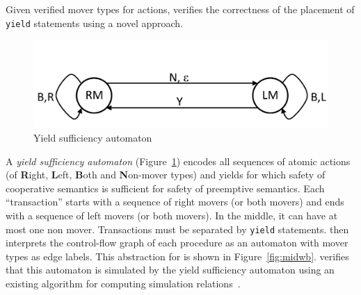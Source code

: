 Given verified mover types for actions, \civl verifies the correctness of the placement of {\tt yield} statements using a novel approach.
\begin{figure}
\vspace*{-1cm}
\begin{center}
\includegraphics[scale=0.25]{YieldTypeCheckingAutomaton.pdf}
\end{center} 
\vspace*{-0.3cm}
\caption{Yield sufficiency automaton}
\label{fig:ysa}
\end{figure}
A {\em yield sufficiency automaton\/} (Figure~\ref{fig:ysa})
encodes all sequences of atomic actions (of {\bf R}ight, 
{\bf L}eft,
{\bf B}oth and
{\bf N}on-mover types)  and yields for which safety of cooperative semantics is sufficient 
for safety of preemptive semantics. 
Each ``transaction'' starts with a sequence of right movers (or both movers) and ends with a sequence of left movers (or both movers).
In the middle, it can have at most one non mover. Transactions must be
separated by {\tt yield} statements.
\civl then interprets the control-flow graph of each procedure as an automaton with mover types as edge labels. 
This abstraction for  is shown in Figure~\ref{fig:midwb}.
\civl verifies that this automaton is simulated by the yield sufficiency automaton using an existing algorithm for computing simulation relations~\cite{HenzingerHK95}.

